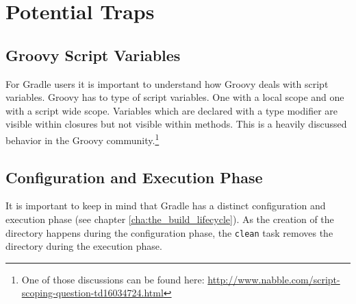 \chapter{Potential Traps} %
\label{cha:potential_traps}
\section{Groovy Script Variables} %
\label{sec:groovy_script_variables}
For Gradle users it is important to understand how Groovy deals with script variables. Groovy has to type of script variables. One with a local scope and one with a script wide scope.
Variables which are declared with a type modifier are visible within closures but not visible within methods. This is a heavily discussed behavior in the Groovy community.\footnote{One of those discussions can be found here: \url{http://www.nabble.com/script-scoping-question-td16034724.html}}

\section{Configuration and Execution Phase} %
\label{sec:configuration_and_execution_phase}
It is important to keep in mind that Gradle has a distinct configuration and execution phase (see chapter \ref{cha:the_build_lifecycle}). 
As the creation of the directory happens during the configuration phase, the \texttt{clean} task removes the directory during the execution phase.

